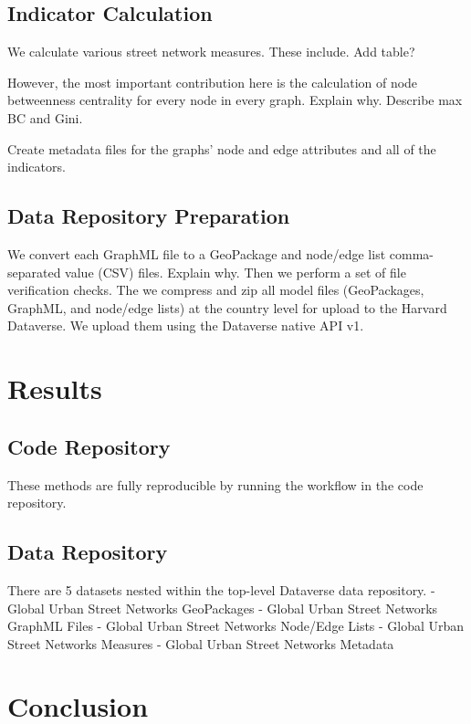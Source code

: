 \documentclass[12pt,letterpaper]{article} %
\begin{document}
\subsection{Indicator Calculation}

We calculate various street network measures. These include. Add table?

However, the most important contribution here is the calculation of node betweenness centrality for every node in every graph. Explain why. Describe max BC and Gini.

Create metadata files for the graphs' node and edge attributes and all of the indicators.

\subsection{Data Repository Preparation}

We convert each GraphML file to a GeoPackage and node/edge list comma-separated value (CSV) files. Explain why. Then we perform a set of file verification checks. The we compress and zip all model files (GeoPackages, GraphML, and node/edge lists) at the country level for upload to the Harvard Dataverse. We upload them using the Dataverse native API v1.

\section{Results}

\subsection{Code Repository}

These methods are fully reproducible by running the workflow in the code repository.

\subsection{Data Repository}

There are 5 datasets nested within the top-level Dataverse data repository.
- Global Urban Street Networks GeoPackages
- Global Urban Street Networks GraphML Files
- Global Urban Street Networks Node/Edge Lists
- Global Urban Street Networks Measures
- Global Urban Street Networks Metadata

\section{Conclusion}
\end{document}
